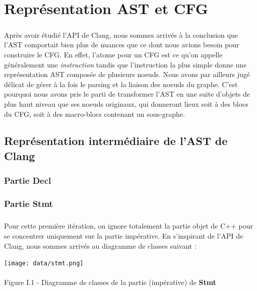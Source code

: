 \documentclass{report}
\begin{document}
\chapter{Repr\'{e}sentation AST et CFG}

\paragraph{}
\hspace{4mm}\textnormal{Apr\`{e}s avoir \'{e}tudi\'{e} l'API de Clang, nous sommes arriv\'{e}s \`{a} la conclusion que l'AST comportait bien plus de nuances que ce dont nous avions besoin
pour construire le CFG. En effet, l'atome pour un CFG est ce qu'on appelle g\'{e}n\'{e}ralement une \textit{instruction} tandis que l'instruction la plus simple
donne une repr\'{e}sentation AST compos\'{e}e de plusieurs noeuds. Nous avons par ailleurs jug\'{e} d\'{e}licat de g\'{e}rer \`{a} la fois le parsing et la liaison des noeuds du graphe.
C'est pourquoi nous avons pris le parti de transformer l'AST en une suite d'objets de plus haut niveau que ses noeuds originaux, qui donneront lieux soit \`{a} des blocs
du CFG, soit \`{a} des macro-blocs contenant un sous-graphe.}

\section{Repr\'{e}sentation interm\'{e}diaire de l'AST de Clang}

\subsection{Partie \textbf{Decl}}

\subsection{Partie \textbf{Stmt}}

\paragraph{}
\hspace{4mm}\textnormal{Pour cette premi\`{e}re it\'{e}ration, on ignore totalement la partie objet de C++ pour se concentrer uniquement sur
la partie imp\'{e}rative. En s'inspirant de l'API de Clang, nous sommes arriv\'{e}s au diagramme de classes suivant :}

\begin{center}
\texttt{[image: data/stmt.png]}
~\\~\\Figure I.1 - Diagramme de classes de la partie (imp\'{e}rative) de \textbf{Stmt}
\end{center}
\end{document}

